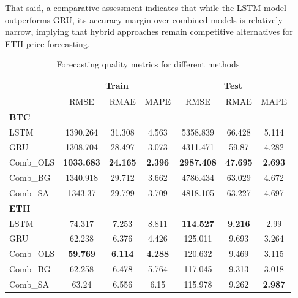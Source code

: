 \documentclass{dsfe}
\begin{document}
That said, a comparative assessment indicates that while the LSTM model outperforms GRU, its accuracy margin over combined models is relatively narrow, implying that hybrid approaches remain competitive alternatives for ETH price forecasting.
\begin{table}[t]
\centering
\caption{Forecasting quality metrics for different methods}\label{metrics}
\begin{tabular}{lccc|ccc}
\hline
\multicolumn{1}{c}{ } & \multicolumn{3}{c}{Train} & \multicolumn{3}{c}{Test} \\
\hline
 & RMSE & RMAE & MAPE & RMSE & RMAE & MAPE\\ \hline
\multicolumn{7}{l}{\textbf{BTC}}\\
\hspace{1em}LSTM & 1390.264 & 31.308 & 4.563 & 5358.839 & 66.428 & 5.114\\
\hspace{1em}GRU & 1308.704 & 28.497 & 3.073 & 4311.471 & 59.87 & 4.282\\
\hspace{1em}Comb\_OLS & \textbf{1033.683} & \textbf{24.165} &\textbf{ 2.396} & \textbf{2987.408} & \textbf{47.695} & \textbf{2.693}\\
\hspace{1em}Comb\_BG & 1340.918 & 29.712 & 3.662 & 4786.434 & 63.029 & 4.672\\
\hspace{1em}Comb\_SA & 1343.37 & 29.799 & 3.709 & 4818.105 & 63.227 & 4.697\\ \hline
\multicolumn{7}{l}{\textbf{ETH}}\\
\hspace{1em}LSTM & 74.317 & 7.253 & 8.811 & \textbf{114.527} & \textbf{9.216} & 2.99\\
\hspace{1em}GRU & 62.238 & 6.376 & 4.426 & 125.011 & 9.693 & 3.264\\
\hspace{1em}Comb\_OLS & \textbf{59.769} & \textbf{6.114} & \textbf{4.288} & 120.632 & 9.469 & 3.115\\
\hspace{1em}Comb\_BG & 62.258 & 6.478 & 5.764 & 117.045 & 9.313 & 3.018\\
\hspace{1em}Comb\_SA & 63.24 & 6.556 & 6.15 & 115.978 & 9.262 & \textbf{2.987}\\ \hline

\end{tabular}
\end{table}
\end{document}
